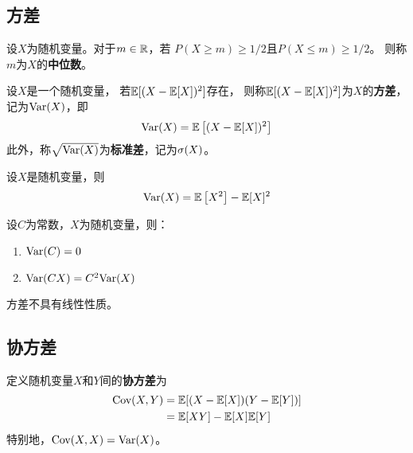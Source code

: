 \subsection{方差}
\begin{definition}[中位数]
  设$X$为随机变量。对于$m\in\mathbb{R}$，若
  $P(X\ge m) \ge 1/2$且$P(X\le m) \ge 1/2$。
  则称$m$为$X$的\textbf{中位数}。
\end{definition}

\begin{definition}[方差与标准差]
  设$X$是一个随机变量，
  若$\mathbb{E}[(X-\mathbb{E}[X])^2]$存在，
  则称$\mathbb{E}[(X-\mathbb{E}[X])^2]$为$X$的\textbf{方差}，
  记为$\textrm{Var}(X)$，即
  \begin{displaymath}
    \textrm{Var}(X) = \mathbb{E}\left[(X-\mathbb{E}[X])^2\right]
  \end{displaymath}
  此外，称$\sqrt{\textrm{Var}(X)}$为\textbf{标准差}，记为$\sigma(X)$。
\end{definition}

\begin{theorem}[方差的其它计算方法]
  设$X$是随机变量，则
  \begin{displaymath}
    \textrm{Var}(X) = \mathbb{E}\left[X^2\right]-\mathbb{E}[X]^2
  \end{displaymath}
\end{theorem}

\begin{theorem}[方差的性质]
  设$C$为常数，$X$为随机变量，则：
  \begin{enumerate}
    \item 
    $\textrm{Var}(C)=0$
    \item
    $\textrm{Var}(CX)=C^2\textrm{Var}(X)$
  \end{enumerate}
\end{theorem}

\begin{remark}
  方差不具有线性性质。
\end{remark}

\subsection{协方差}
\begin{definition}[协方差]
  定义随机变量$X$和$Y$间的\textbf{协方差}为
  \begin{align*}
    \textrm{Cov}(X,Y)
    &=\mathbb{E}[(X-\mathbb{E}[X])(Y-\mathbb{E}[Y])] \\
    &= \mathbb{E}[XY] - \mathbb{E}[X]\mathbb{E}[Y]
  \end{align*}
  特别地，$\textrm{Cov}(X,X)=\textrm{Var}(X)$。
\end{definition}

